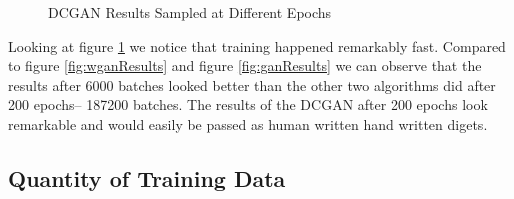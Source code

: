 \documentclass[12pt,
 reprint,
 amsmath,amssymb,
 aps,
]{revtex4-2}
\begin{document}
\begin{figure}[h!]
    \centering
    \qquad
    \qquad
    \caption{DCGAN Results Sampled at Different Epochs}%
    \label{fig:dcganResults}%
\end{figure}

Looking at figure \ref{fig:dcganResults} we notice that training happened remarkably fast. Compared to figure \ref{fig:wganResults} and figure \ref{fig:ganResults} we can observe that the results after 6000 batches looked better than the other two algorithms did after 200 epochs-- 187200 batches. The results of the DCGAN after 200 epochs look remarkable and would easily be passed as human written hand written digets. 

\subsection{\label{sec:expData}Quantity of Training Data}
\end{document}
